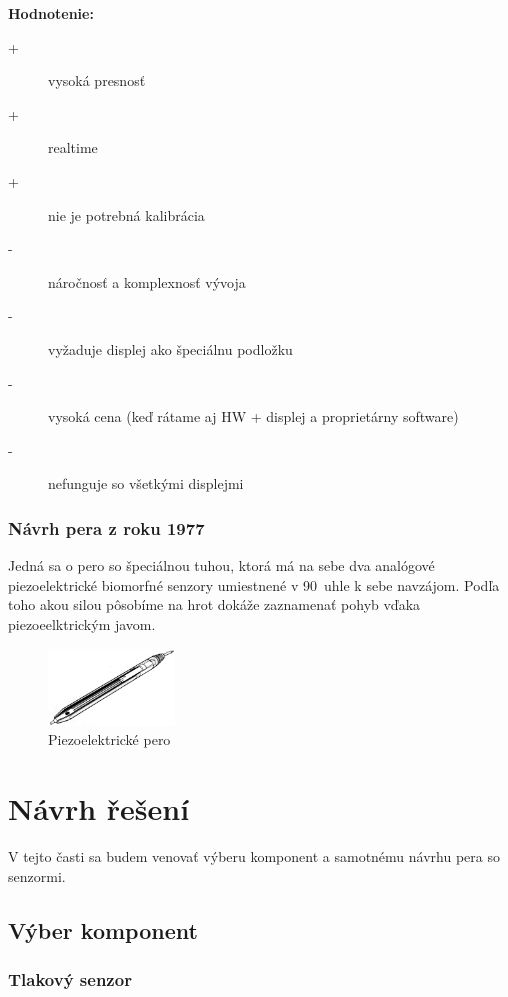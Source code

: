 \textbf{Hodnotenie:}
\begin{description}
	\item[+]{vysoká presnosť}
	\item[+]{realtime}
	\item[+]{nie je potrebná kalibrácia}
	\item[-]{náročnosť a komplexnosť vývoja}
	\item[-]{vyžaduje displej ako špeciálnu podložku}
	\item[-]{vysoká cena (keď rátame aj HW + displej a proprietárny software)}
	\item[-]{nefunguje so všetkými displejmi}
\end{description}

\subsection*{Návrh pera z roku 1977}

Jedná sa o pero so špeciálnou tuhou, ktorá má na sebe dva analógové piezoelektrické biomorfné senzory umiestnené v 90\degree~uhle k sebe navzájom. Podľa toho akou silou pôsobíme na hrot dokáže zaznamenať pohyb vďaka piezoeelktrickým javom.\cite{EernisseE}

\begin{figure}[hbt]
	\centering
	\includegraphics[width=0.3\textwidth]{obrazky-figures/piezoPen1997.png}
	\caption{Piezoelektrické pero}
	\label{piezoPen1997}
\end{figure}

\chapter{Návrh řešení}

V tejto časti sa budem venovať výberu komponent a samotnému návrhu pera so senzormi.

\section{Výber komponent}

\subsection*{Tlakový senzor}

